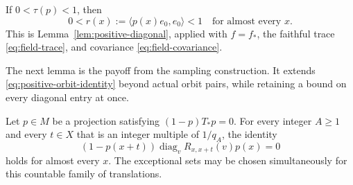If $0<\tau(p)<1$, then
\begin{equation}\label{eq:diagonal-interior}
 0<r(x):=\langle p(x)e_0,e_0\rangle<1
 \quad\text{for almost every }x.
\end{equation}
This is Lemma~\ref{lem:positive-diagonal}, applied with $f=f_*$,
the faithful trace \eqref{eq:field-trace}, and covariance
\eqref{eq:field-covariance}.

The next lemma is the payoff from the sampling construction.  It extends
\eqref{eq:positive-orbit-identity} beyond actual orbit pairs, while retaining
a bound on every diagonal entry at once.

\begin{lemma}\label{lem:rational-graphs}
Let $p\in M$ be a projection satisfying $(1-p)T_*p=0$.
For every integer $A\ge1$ and every $t\in X$ that is an integer multiple of
$1/q_A$, the identity
\begin{equation}\label{eq:rational-graph-identity}
 (1-p(x+t))\operatorname{diag}_v R_{x,x+t}(v)p(x)=0
\end{equation}
holds for almost every $x$.  The exceptional sets may be chosen
simultaneously for this countable family of translations.
\end{lemma}

